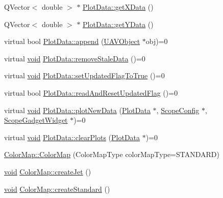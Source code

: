 \begin{DoxyCompactItemize}
\-Q\-Vector$<$ double $>$ $\ast$ \hyperlink{group___scope_plugin_gaadbf87fb25ba73a5079d44e88f357cd9}{\-Plot\-Data\-::get\-X\-Data} ()
\item 
\-Q\-Vector$<$ double $>$ $\ast$ \hyperlink{group___scope_plugin_gac891ccbeaba7cca3cc03233f4ecd0cda}{\-Plot\-Data\-::get\-Y\-Data} ()
\item 
virtual bool \hyperlink{group___scope_plugin_ga5b3222f1966c12cc3dbbfe79f80f49e8}{\-Plot\-Data\-::append} (\hyperlink{class_u_a_v_object}{\-U\-A\-V\-Object} $\ast$obj)=0
\item 
virtual \hyperlink{group___u_a_v_objects_plugin_ga444cf2ff3f0ecbe028adce838d373f5c}{void} \hyperlink{group___scope_plugin_gaa72c7c3b2933a5f313be52020c003990}{\-Plot\-Data\-::remove\-Stale\-Data} ()=0
\item 
virtual \hyperlink{group___u_a_v_objects_plugin_ga444cf2ff3f0ecbe028adce838d373f5c}{void} \hyperlink{group___scope_plugin_ga9c8859638969e941f2e71d57b9454c37}{\-Plot\-Data\-::set\-Updated\-Flag\-To\-True} ()=0
\item 
virtual bool \hyperlink{group___scope_plugin_ga18a9ab6db2aa09b675a0ede1e0bfddc6}{\-Plot\-Data\-::read\-And\-Reset\-Updated\-Flag} ()=0
\item 
virtual \hyperlink{group___u_a_v_objects_plugin_ga444cf2ff3f0ecbe028adce838d373f5c}{void} \hyperlink{group___scope_plugin_ga804704f7eaf4186938e8d1163a9d410c}{\-Plot\-Data\-::plot\-New\-Data} (\hyperlink{class_plot_data}{\-Plot\-Data} $\ast$, \hyperlink{class_scope_config}{\-Scope\-Config} $\ast$, \hyperlink{class_scope_gadget_widget}{\-Scope\-Gadget\-Widget} $\ast$)=0
\item 
virtual \hyperlink{group___u_a_v_objects_plugin_ga444cf2ff3f0ecbe028adce838d373f5c}{void} \hyperlink{group___scope_plugin_ga69868354ebe2ca7e39c8663d547c5935}{\-Plot\-Data\-::clear\-Plots} (\hyperlink{class_plot_data}{\-Plot\-Data} $\ast$)=0
\item 
\hyperlink{group___scope_plugin_ga161e07946c9ab58fd04048a781700ff6}{\-Color\-Map\-::\-Color\-Map} (\-Color\-Map\-Type color\-Map\-Type=\-S\-T\-A\-N\-D\-A\-R\-D)
\item 
\hyperlink{group___u_a_v_objects_plugin_ga444cf2ff3f0ecbe028adce838d373f5c}{void} \hyperlink{group___scope_plugin_ga040b747e27af88d72ffee08958e26e1c}{\-Color\-Map\-::create\-Jet} ()
\item 
\hyperlink{group___u_a_v_objects_plugin_ga444cf2ff3f0ecbe028adce838d373f5c}{void} \hyperlink{group___scope_plugin_ga1900e4d813aed6169f83d1d83c3746e3}{\-Color\-Map\-::create\-Standard} ()
\item 

\end{DoxyCompactItemize}
